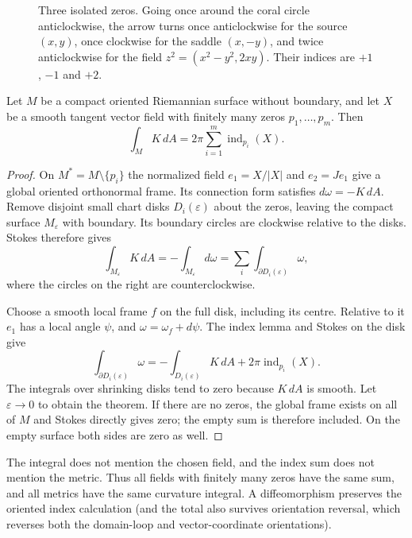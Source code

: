 \begin{figure}[ht]
\centering
{}
\caption{Three isolated zeros. Going once around the coral circle anticlockwise, the arrow turns once anticlockwise for the source $(x,y)$, once
clockwise for the saddle $(x,-y)$, and twice anticlockwise for the field $z^2=(x^2-y^2,2xy)$. Their indices are $+1$, $-1$ and $+2$.}
\label{fig:index}
\end{figure}

\begin{theorem}\label{thm:gaussbonnet}
Let $M$ be a compact oriented Riemannian surface without boundary, and let $X$ be a smooth tangent vector field with finitely many zeros $p_1,\ldots,p_m$. Then
\[
\int_MK\,dA=2\pi\sum_{i=1}^m\operatorname{ind}_{p_i}(X).
\]
\end{theorem}

\begin{proof}
On $M^*=M\setminus\{p_i\}$ the normalized field $e_1=X/|X|$ and $e_2=Je_1$ give a global oriented orthonormal frame. Its connection form satisfies $d\omega=-K\,dA$. Remove disjoint small chart disks $D_i(\varepsilon)$ about the zeros, leaving the compact surface $M_\varepsilon$ with boundary. Its boundary circles are clockwise relative to the disks. Stokes therefore gives
\[
\int_{M_\varepsilon}K\,dA
=-\int_{M_\varepsilon}d\omega
=\sum_i\int_{\partial D_i(\varepsilon)}\omega,
\]
where the circles on the right are counterclockwise.

Choose a smooth local frame $f$ on the full disk, including its centre. Relative to it $e_1$ has a local angle $\psi$, and $\omega=\omega_f+d\psi$. The index lemma and Stokes on the disk give
\[
\int_{\partial D_i(\varepsilon)}\omega
=-\int_{D_i(\varepsilon)}K\,dA+2\pi\operatorname{ind}_{p_i}(X).
\]
The integrals over shrinking disks tend to zero because $K\,dA$ is smooth. Let $\varepsilon\to0$ to obtain the theorem. If there are no zeros, the global frame exists on all of $M$ and Stokes directly gives zero; the empty sum is therefore included. On the empty surface both sides are zero as well.
\end{proof}

The integral does not mention the chosen field, and the index sum does not mention the metric. Thus all fields with finitely many zeros have the same sum, and all metrics have the same curvature integral. A diffeomorphism preserves the oriented index calculation (and the total also survives orientation reversal, which reverses both the domain-loop and vector-coordinate orientations).

